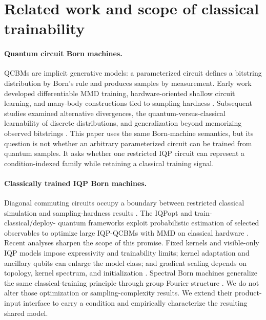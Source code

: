 \documentclass[a4paper,twocolumn,11pt,unpublished]{quantumarticle}
\begin{document}
\section{Related work and scope of classical trainability}

\paragraph{Quantum circuit Born machines.}
QCBMs are implicit generative models: a parameterized circuit defines a
bitstring distribution by Born's rule and produces samples by measurement.
Early work developed differentiable MMD training, hardware-oriented shallow
circuit learning, and many-body constructions tied to sampling hardness
\cite{liuDifferentiableLearning2018,benedettiGenerativeModeling2019,
gaoQuantumGenerativeModels2018}.  Subsequent studies examined alternative divergences,
the quantum-versus-classical learnability of discrete distributions, and
generalization beyond memorizing observed bitstrings
\cite{swekeQuantumClassicalLearnability2021,leadbeaterFDivergences2021,
duPowerQuantumGenerative2023,giliQuantumCircuitBornGeneralize2023}.  This paper
uses the same Born-machine semantics, but its question is not whether an
arbitrary parameterized circuit can be trained from quantum samples.  It asks
whether one restricted IQP circuit can represent a condition-indexed family
while retaining a classical training signal.

\paragraph{Classically trained IQP Born machines.}
Diagonal commuting circuits occupy a boundary between restricted classical
simulation and sampling-hardness results
\cite{nakataDiagonalQuantumCircuits2014,niCommutingQuantumCircuits2012,
bremnerAchievingQuantumSupremacy2017}.  The IQPopt and train-classical/deploy-
quantum frameworks exploit probabilistic estimation of selected observables to
optimize large IQP-QCBMs with MMD on classical hardware
\cite{nestSimulatingQuantumComputers2011,
recio-armengolIQPoptFastOptimization2025,
recio-armengolTrainClassicalDeploy2026}.  Recent analyses sharpen the scope of
this promise.  Fixed kernels and visible-only IQP models impose expressivity
and trainability limits; kernel adaptation and ancillary qubits can enlarge the
model class; and gradient scaling depends on topology, kernel spectrum, and
initialization
\cite{kurkinUniversalityKernelAdaptive2025,
shenCharacterizingTrainability2026,lerchInitializationStrategies2026,
deLucaGaussianInitialization2026}.  Spectral Born machines generalize the same
classical-training principle through group Fourier structure
\cite{huangSpectralBornMachines2026}.  We do not alter those optimization or
sampling-complexity results.  We extend their product-input interface to carry
a condition and empirically characterize the resulting shared model.
\end{document}
